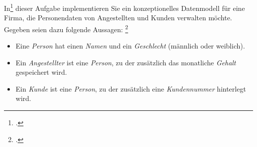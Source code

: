 \documentclass{bschlangaul-aufgabe}
\begin{document}

In\footcite[Vererbung und Abstrakte Klassen II, Aufgabe 2]{aud:pu:7}
dieser Aufgabe implementieren Sie ein
konzeptionelles Datenmodell für eine Firma, die Personendaten von
Angestellten und Kunden verwalten möchte. Gegeben seien dazu folgende
Aussagen:
\footcite[Thema 1 Teilaufgabe 2 Aufgabe 3 Seite 5]{examen:66116:2015:03}

\begin{itemize}
\item Eine \emph{Person} hat einen \emph{Namen} und ein
\emph{Geschlecht} (männlich oder weiblich).

\item Ein \emph{Angestellter} ist eine \emph{Person}, zu der zusätzlich
das monatliche \emph{Gehalt} gespeichert wird.

\item Ein \emph{Kunde} ist eine \emph{Person}, zu der zusätzlich eine
\emph{Kundennummer} hinterlegt wird.
\end{itemize}
\end{document}
